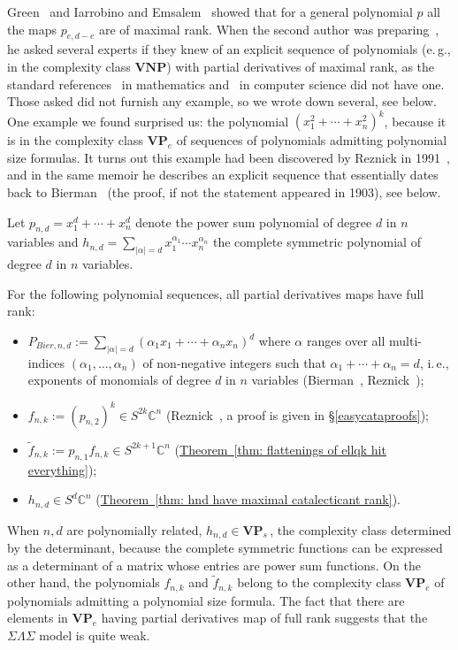 \documentclass[11pt]{article}
\numberwithin{equation}{section}
\theoremstyle{definition}
\theoremstyle{plain}
\newcommand{\ie}{i.\,e.}
\newcommand{\eg}{e.\,g.}
\newcommand{\expref}[2]{\hyperref[#2]{#1~\ref{#2}}}
\newcommand{\vvirg}{ , \dots , }
\renewcommand{\tilde}[1]{\widetilde{#1}}
\newcommand{\bfVNP}{\mathbf{VNP}}
\newcommand{\bfVP}{\mathbf{VP}}
\def\BC{\mathbb C}
\begin{document}
%
Green~\cite{MR0480472} and Iarrobino and Emsalem~\cite{MR515043} showed that for a general polynomial $p$ all the maps $p_{e,d-e}$ are of maximal rank. When the second author was preparing~\cite{Lsimons}, he asked several experts if they knew of an explicit  sequence of polynomials (\eg, in the complexity class $\bfVNP$) with partial derivatives of maximal rank, as the standard references~\cite{MR1735271} in mathematics and~\cite{MR2901512} in computer science did not have one. Those asked did not furnish any example, so we wrote down several, see below. One example we found surprised us: the polynomial $(x_1^2+\cdots +x_n^2)^k$, because it is in  the complexity class  $\bfVP_e$ of sequences of polynomials admitting polynomial size formulas. It turns out this example had been discovered by Reznick in 1991~\cite[Thm. 8.15]{MR1096187}, and in the same memoir he describes an explicit sequence that essentially dates back to  Bierman~\cite{MR1547094} (the proof, if not the statement appeared in 1903), see below.

 Let $p_{n,d}=x_1^d +\cdots + x_n^d$ denote the power sum polynomial  of degree $d$ in $n$ variables and $h_{n,d}=\sum_{\vert \alpha \vert=d}x_1^{\alpha_1}\cdots x_{n}^{\alpha_n}$ the complete symmetric polynomial  of degree $d$ in $n$ variables. 

For the following polynomial sequences, all partial derivatives
%
maps   %
have full rank:
\begin{itemize}
\item $P_{Bier, n,d}:=\sum_{\vert \alpha\vert = d}(\alpha_{1}x_1+\cdots + \alpha_{n} x_{n})^d$ where $\alpha$ ranges over all  multi-indices  $(\alpha_{1}\vvirg  \alpha_{n})$  of non-negative integers  such that $\alpha_{1}+\cdots + \alpha_{n}=d$, \ie,  %
exponents of monomials of degree $d$ in $n$ variables (Bierman~\cite{MR1547094}, Reznick~\cite{MR1096187});
 
\item $f_{n,k}:=(p_{n,2})^k\in S^{2k}\BC^n$\quad
%
(Reznick~\cite{MR1096187}, a proof is given in \S\ref{easycataproofs});
 
\item $\tilde f_{n,k}:=p_{n,1}f_{n,k}\in S^{2k+1}\BC^n$\quad
(\expref{Theorem}{thm: flattenings of ellqk hit everything});
 
\item $h_{n,d}\in S^d\BC^n$\quad
  (\expref{Theorem}{thm: hnd have maximal catalecticant rank}).
 \end{itemize}
 
 When $n,d$ are polynomially related, $h_{n,d}\in \bfVP_s$\,, the complexity class determined by the determinant,  because the complete symmetric functions can be expressed as a determinant of a matrix whose entries are power sum functions. On the other hand, the polynomials $f_{n,k}$ and $\tilde{f}_{n,k}$ belong to the complexity class $\bfVP_e$ of polynomials admitting a polynomial size formula. The fact that there are elements in $\bfVP_e$ having partial derivatives map of full rank suggests that the $\Sigma\Lambda\Sigma$ model is quite weak.
 
\end{document}

